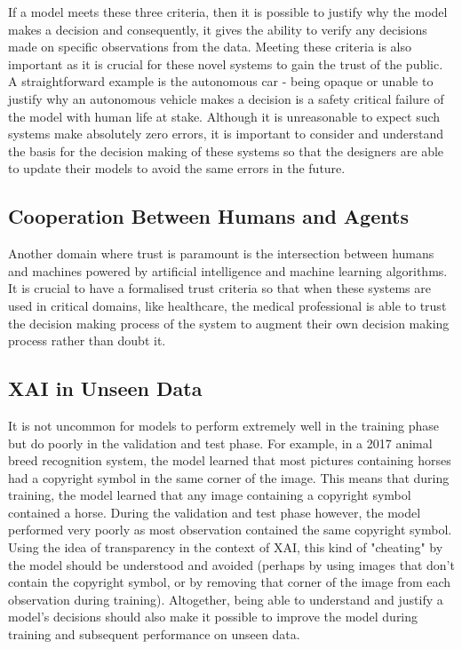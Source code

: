 \documentclass{article}
\begin{document}
If a model meets these three criteria, then it is possible to justify why the model makes a decision and consequently, it gives the ability to verify any decisions made on specific observations from the data. Meeting these criteria is also important as it is crucial for these novel systems to gain the trust of the public. A straightforward example is the autonomous car - being opaque or unable to justify why an autonomous vehicle makes a decision is a safety critical failure of the model with human life at stake. Although it is unreasonable to expect such systems make absolutely zero errors, it is important to consider and understand the basis for the decision making of these systems so that the designers are able to update their models to avoid the same errors in the future.
 
 
\subsection{Cooperation Between Humans and Agents}
 
Another domain where trust is paramount is the intersection between humans and machines powered by artificial intelligence and machine learning algorithms. It is crucial to have a formalised trust criteria so that when these systems are used in critical domains, like healthcare, the medical professional is able to trust the decision making process of the system to augment their own decision making process rather than doubt it.

\subsection{XAI in Unseen Data}

It is not uncommon for models to perform extremely well in the training phase but do poorly in the validation and test phase. For example, in a 2017 animal breed recognition system, the model learned that most pictures containing horses had a copyright symbol in the same corner of the image. This means that during training, the model learned that any image containing a copyright symbol contained a horse. During the validation and test phase however, the model performed very poorly as most observation contained the same copyright symbol. Using the idea of transparency in the context of XAI, this kind of "cheating" by the model should be understood and avoided (perhaps by using images that don't contain the copyright symbol, or by removing that corner of the image from each observation during training). Altogether, being able to understand and justify a model's decisions should also make it possible to improve the model during training and subsequent performance on unseen data. 
\end{document}
